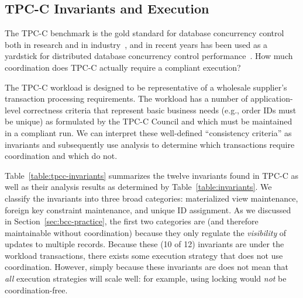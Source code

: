 \subsection{TPC-C Invariants and Execution}
\label{sec:tpcc-invariants}

The TPC-C benchmark is the gold standard for database concurrency
control~\cite{oltpbench} both in research and in industry~\cite{tpcc},
and in recent years has been used as a yardstick for distributed
database concurrency control
performance~\cite{calvin,hstore,silo}. How much coordination does
TPC-C actually require a compliant execution?

The TPC-C workload is designed to be representative of a wholesale
supplier's transaction processing requirements. The workload has a number of
application-level correctness criteria that represent basic business
needs (e.g., order IDs must be unique) as formulated by the TPC-C
Council and which must be maintained in a compliant run. We can
interpret these well-defined ``consistency criteria'' as invariants and
subsequently use \iconfluence analysis to determine which transactions
require coordination and which do not.

Table~\ref{table:tpcc-invariants} summarizes the twelve invariants
found in TPC-C as well as their \iconfluence analysis results as
determined by Table~\ref{table:invariants}. We classify the invariants
into three broad categories: materialized view maintenance, foreign
key constraint maintenance, and unique ID assignment. As we discussed
in Section~\ref{sec:bcc-practice}, the first two categories are
\iconfluent (and therefore maintainable without coordination) because
they only regulate the \textit{visibility} of updates to multiple
records. Because these (10 of 12) invariants are \iconfluent under the
workload transactions, there exists some execution strategy that does
not use coordination. However, simply because these invariants are
\iconfluent does not mean that \textit{all} execution strategies will
scale well: for example, using locking would \textit{not} be
coordination-free.


